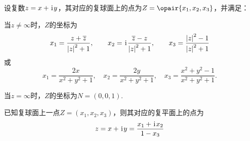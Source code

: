 \begin{theorem}
设复数\(z=x+\kern1pt\mathrm{i}\kern1pt y\)，其对应的复球面上的点为\(Z=\opair{x_1,x_2,x_3}\)，并满足：

当\(z \neq \infty\)时，\(Z\)的坐标为\[
x_1 = \frac{z + \overline{z}}{\abs{z}^2 + 1}, \qquad
x_2 = \kern1pt\mathrm{i}\kern1pt\frac{\overline{z} - z}{\abs{z}^2 + 1}, \qquad
x_3 = \frac{\abs{z}^2 - 1}{\abs{z}^2 + 1}
\]或\[
x_1 = \frac{2x}{x^2+y^2+1}, \quad
x_2 = \frac{2y}{x^2+y^2+1}, \quad
x_3 = \frac{x^2+y^2-1}{x^2+y^2+1}.
\]

当\(z = \infty\)时，\(Z\)的坐标为\(N = (0,0,1)\).
\end{theorem}

\begin{theorem}
已知复球面上一点\(Z=(x_1,x_2,x_3)\)，则其对应的复平面上的点为\[
z = x+\kern1pt\mathrm{i}\kern1pt y = \frac{x_1+\kern1pt\mathrm{i}\kern1pt x_2}{1-x_3}
\]
\end{theorem}
